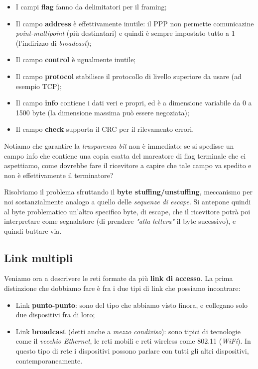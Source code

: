 \documentclass[a4paper,11pt]{article}
\begin{document}
\begin{itemize}
	\item I campi \textbf{flag} fanno da delimitatori per il framing;
	\item Il campo \textbf{address} è effettivamente inutile: il PPP non permette comunicazine \textit{point-multipoint} (più destinatari) e quindi è sempre impostato tutto a 1 (l'indirizzo di \textit{broadcast});
	\item Il campo \textbf{control} è ugualmente inutile;
	\item Il campo \textbf{protocol} stabilisce il protocollo di livello superiore da usare (ad esempio TCP);
	\item Il campo \textbf{info} contiene i dati veri e propri, ed è a dimensione variabile da 0 a 1500 byte (la dimensione massima può essere negoziata);
	\item Il campo \textbf{check} supporta il CRC per il rilevamento errori.
\end{itemize}

Notiamo che garantire la \textit{trasparenza bit} non è immediato: se si spedisse un campo info che contiene una copia esatta del marcatore di flag terminale che ci aspettiamo, come dovrebbe fare il ricevitore a capire che tale campo va spedito e non è effettivamente il terminatore?

Risolviamo il problema sfruttando il \textbf{byte stuffing/unstuffing}, meccanismo per noi sostanzialmente analogo a quello delle \textit{sequenze di escape}.
Si antepone quindi al byte problematico un'altro specifico byte, di escape, che il ricevitore potrà poi interpretare come segnalatore (di prendere \textit{"alla lettera"} il byte sucessivo), e quindi buttare via.

\subsection{Link multipli}
Veniamo ora a descrivere le reti formate da più \textbf{link di accesso}.
La prima distinzione che dobbiamo fare è fra i due tipi di link che possiamo incontrare:
\begin{itemize}
	\item Link \textbf{punto-punto}: sono del tipo che abbiamo visto finora, e collegano solo due dispositivi fra di loro;
	\item Link \textbf{broadcast} (detti anche a \textit{mezzo condiviso}): sono tipici di tecnologie come il \textit{vecchio Ethernet}, le reti mobili e reti wireless come 802.11 (\textit{WiFi}). In questo tipo di rete i dispositivi possono parlare con tutti gli altri dispositivi, contemporaneamente.  
\end{itemize}
\end{document}
